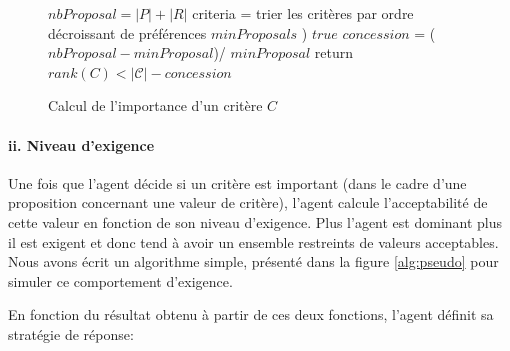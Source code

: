 	\begin{figure}[h]
		\caption{\label{alg:important} Calcul de l'importance d'un critère $C$}
		\begin{algorithmic}[1]
			\State $nbProposal = |P| + |R|$ 
			\State criteria = trier les critères par ordre décroissant de préférences
			\State $minProposals$ 
			) 
			\State $true$ 
			\Else
			\State $concession $ = ($nbProposal - minProposal$)/ $minProposal$
			\State return $rank(C) < |\mathcal{C}| - concession$
			\EndIf 
			\EndFunction
		\end{algorithmic}
	\end{figure}
	
	\paragraph{ii. Niveau d'exigence}
		Une fois que l'agent décide si un critère est important (dans le cadre d'une proposition concernant une valeur de critère), l'agent calcule l'acceptabilité de cette valeur en fonction de son niveau d'exigence. Plus l'agent est dominant plus il est exigent et donc tend à avoir un ensemble restreints de valeurs acceptables. Nous avons écrit un algorithme simple, présenté dans la figure \ref{alg:pseudo} pour simuler ce comportement d'exigence. 
	
	En fonction du résultat obtenu à partir de ces deux fonctions, l'agent définit sa stratégie de réponse: 
	
